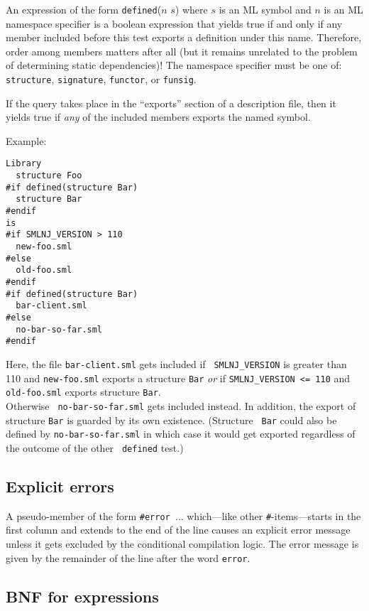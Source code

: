 \documentclass{article}
\begin{document}
An expression of the form {\tt defined}($n$ $s$) where $s$ is an ML
symbol and $n$ is an ML namespace specifier is a boolean expression
that yields true if and only if any member included before this test
exports a definition under this name.  Therefore, order among members
matters after all (but it remains unrelated to the problem of
determining static dependencies)!  The namespace specifier must be one
of: {\tt structure}, {\tt signature}, {\tt functor}, or {\tt funsig}.

If the query takes place in the ``exports'' section of a description
file, then it yields true if {\em any} of the included members exports
the named symbol.

\noindent Example:

\begin{verbatim}
Library
  structure Foo
#if defined(structure Bar)
  structure Bar
#endif
is
#if SMLNJ_VERSION > 110
  new-foo.sml
#else
  old-foo.sml
#endif
#if defined(structure Bar)
  bar-client.sml
#else
  no-bar-so-far.sml
#endif
\end{verbatim}

Here, the file {\tt bar-client.sml} gets included if {\tt
SMLNJ\_VERSION} is greater than 110 and {\tt new-foo.sml} exports a
structure {\tt Bar} {\em or} if {\tt SMLNJ\_VERSION <= 110} and {\tt
old-foo.sml} exports structure {\tt Bar}. \\ Otherwise {\tt
no-bar-so-far.sml} gets included instead.  In addition, the export of
structure {\tt Bar} is guarded by its own existence.  (Structure {\tt
Bar} could also be defined by {\tt no-bar-so-far.sml} in which case it
would get exported regardless of the outcome of the other {\tt
defined} test.)

\subsection{Explicit errors}

A pseudo-member of the form {\tt \#error $\ldots$} which---like other
{\tt \#}-items---starts in the first column and extends to the end of
the line causes an explicit error message unless it gets excluded by
the conditional compilation logic.  The error message is given by the
remainder of the line after the word {\tt error}.

\subsection{BNF for expressions}
\end{document}

